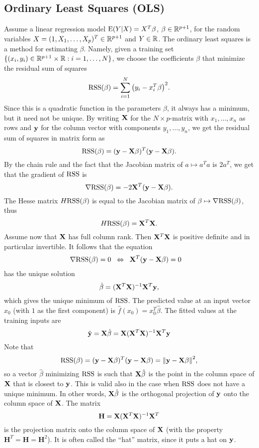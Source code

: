 \subsection{Ordinary Least Squares (OLS)}\label{sec:OLS theory}
Assume a linear regression model $\mathrm{E}(Y|X)=X^T\beta$, $\beta\in\mathbb{R}^{p+1}$, for the random variables $X=(1,X_1,\ldots,X_p)^T\in\mathbb{R}^{p+1}$ and $Y\in\mathbb{R}$. The ordinary least squares is a method for estimating $\beta$. Namely, given a training set $\{(x_i,y_i)\in\mathbb{R}^{p+1}\times\mathbb{R}:i=1,\ldots, N\}$, we choose the coefficients $\beta$ that minimize the residual sum of squares
\[
\mathrm{RSS}(\beta) = \sum_{i=1}^N \qty(y_i-x_i^T\beta)^2.
\]
Since this is a quadratic function in the parameters $\beta$, it always has a minimum, but it need not be unique. By writing $\mathbf{X}$ for the $N\times p$-matrix with $x_1,\ldots,x_n$ as rows and $\mathbf{y}$ for the column vector with components $y_1,\ldots,y_n$, we get the residual sum of squares in matrix form as
\[
\mathrm{RSS}(\beta) = (\mathbf{y}-\mathbf{X}\beta)^T(\mathbf{y}-\mathbf{X}\beta).
\]
By the chain rule and the fact that the Jacobian matrix of $a\mapsto a^Ta$ is $2a^T$, we get that the gradient of $\mathrm{RSS}$ is
\[
\nabla\mathrm{RSS}(\beta)=-2\mathbf{X}^T(\mathbf{y}-\mathbf{X}\beta).
\]
The Hesse matrix $H\mathrm{RSS}(\beta)$ is equal to the Jacobian matrix of $\beta\mapsto\nabla\mathrm{RSS}(\beta)$, thus
\[
H\mathrm{RSS}(\beta)=\mathbf{X}^T\mathbf{X}.
\]
Assume now that $\mathbf{X}$ has full column rank. Then $\mathbf{X}^T\mathbf{X}$ is positive definite and in particular invertible. It follows that the equation
\begin{align*}
    \nabla\mathrm{RSS}(\beta)=0\;\;\Leftrightarrow\;\;\mathbf{X}^T(\mathbf{y}-\mathbf{X}\beta)&=0
\end{align*}
has the unique solution
\begin{equation}\label{eq:ols_fit}
    \hat{\beta} = (\mathbf{X}^T\mathbf{X})^{-1}\mathbf{X}^T\mathbf{y},   
\end{equation}
which gives the unique minimum of $\mathrm{RSS}$. The predicted value at an input vector $x_0$ (with $1$ as the first component) is $\hat{f}(x_0)=x_0^T\hat{\beta}$. The fitted values at the training inputs are
\[
\hat{\mathbf{y}}=\mathbf{X}\hat{\beta}=\mathbf{X}(\mathbf{X}^T\mathbf{X})^{-1}\mathbf{X}^T\mathbf{y}
\]
Note that
\[
\mathrm{RSS}(\beta) = (\mathbf{y}-\mathbf{X}\beta)^T(\mathbf{y}-\mathbf{X}\beta) = \norm{\mathbf{y}-\mathbf{X}\beta}^2,
\]
so a vector $\hat{\beta}$ minimizing $\mathrm{RSS}$ is such that $\mathbf{X}\hat{\beta}$ is the point in the column space of $\mathbf{X}$ that is closest to $\mathbf{y}$. This is valid also in the case when $\mathrm{RSS}$ does not have a unique minimum. In other words, $\mathbf{X}\hat{\beta}$ is the orthogonal projection of $\mathbf{y}$ onto the column space of $\mathbf{X}$. The matrix
\[
\mathbf{H} = \mathbf{X}(\mathbf{X}^T\mathbf{X})^{-1}\mathbf{X}^T
\]
is the projection matrix onto the column space of $\mathbf{X}$ (with the property $\mathbf{H}^T=\mathbf{H}=\mathbf{H}^2$). It is often called the “hat” matrix, since it puts a hat on $\mathbf{y}$.

